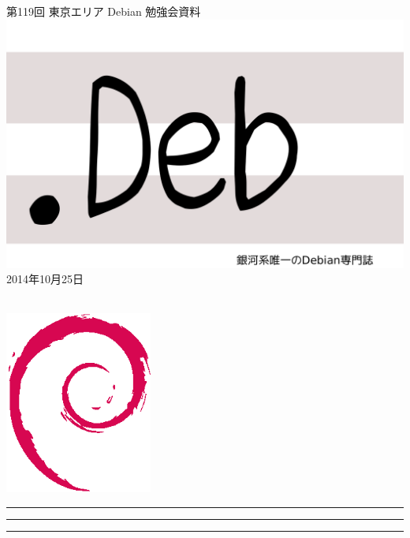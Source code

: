 \documentclass[mingoth,a4paper]{jsarticle}
\newcommand{\debmtgyear}{2014}
\newcommand{\debmtgmonth}{10}
\newcommand{\debmtgdate}{25}
\newcommand{\debmtgnumber}{119}
\begin{document}
\begin{titlepage}
\thispagestyle{empty}

\vspace*{-2cm}
第\debmtgnumber{}回 東京エリア Debian 勉強会資料\\
\hspace*{-2cm}
\includegraphics{image2012-natsu/dotdeb.pdf}\\
\hfill{}\debmtgyear{}年\debmtgmonth{}月\debmtgdate{}日

\\

\vspace*{-2cm}
\hfill{}\includegraphics[height=6cm]{image200502/openlogo-nd.eps}
\end{titlepage}

\newpage

\begin{minipage}[b]{0.2\hsize}
 \colorbox{titleback}{}
\end{minipage}
\begin{minipage}[b]{0.8\hsize}
\hrule
\vspace{2mm}
\hrule
\begin{multicols}{2}
\tableofcontents
\end{multicols}
\vspace{2mm}
\hrule
\end{minipage}
\end{document}
